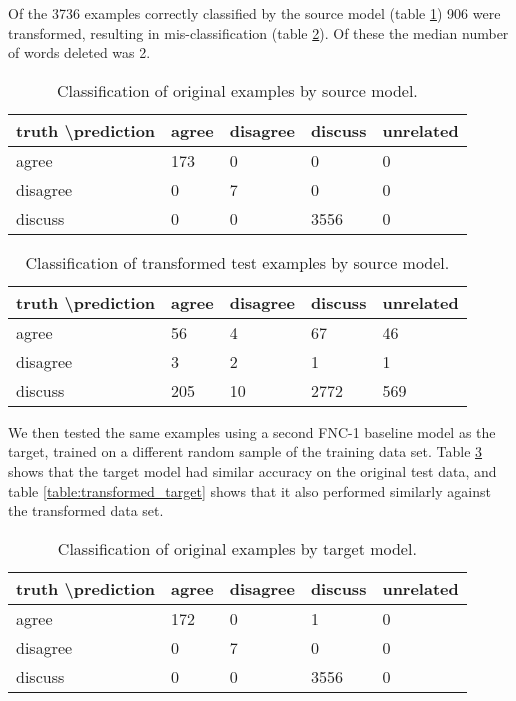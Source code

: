 \documentclass{article}
\begin{document}
Of the 3736 examples correctly classified by the source model (table \ref{table:original}) 906 were transformed, resulting in mis-classification (table \ref{table:transformed}). Of these the median number of words deleted was 2.

\begin{table}[ht]
\centering
\begin{tabular}{|l|l|l|l|l|}
\hline
truth \textbackslash prediction & agree & disagree & discuss & unrelated \\ \hline
agree                           & 173   & 0        & 0       & 0         \\ \hline
disagree                        & 0     & 7        & 0       & 0         \\ \hline
discuss                         & 0     & 0        & 3556    & 0         \\ \hline
\end{tabular}
\caption{Classification of original examples by source model.}
\label{table:original}
\end{table}

\begin{table}[ht]
\centering
\begin{tabular}{|l|l|l|l|l|}
\hline
truth \textbackslash prediction & agree & disagree & discuss & unrelated \\ \hline
agree                           & 56    & 4        & 67      & 46        \\ \hline
disagree                        & 3     & 2        & 1       & 1         \\ \hline
discuss                         & 205   & 10       & 2772    & 569       \\ \hline
\end{tabular}
\caption{Classification of transformed test examples by source model.}
\label{table:transformed}
\end{table}

We then tested the same examples using a second FNC-1 baseline model as the target, trained on a different random sample of the training data set. Table \ref{table:original_target} shows that the target model had similar accuracy on the original test data, and table \ref{table:transformed_target} shows that it also performed similarly against the transformed data set.

\begin{table}[ht]
\centering
\begin{tabular}{|l|l|l|l|l|}
\hline
truth \textbackslash prediction & agree & disagree & discuss & unrelated \\ \hline
agree                           & 172   & 0        & 1       & 0         \\ \hline
disagree                        & 0     & 7        & 0       & 0         \\ \hline
discuss                         & 0     & 0        & 3556    & 0         \\ \hline
\end{tabular}
\caption{Classification of original examples by target model.}
\label{table:original_target}
\end{table}
\end{document}

